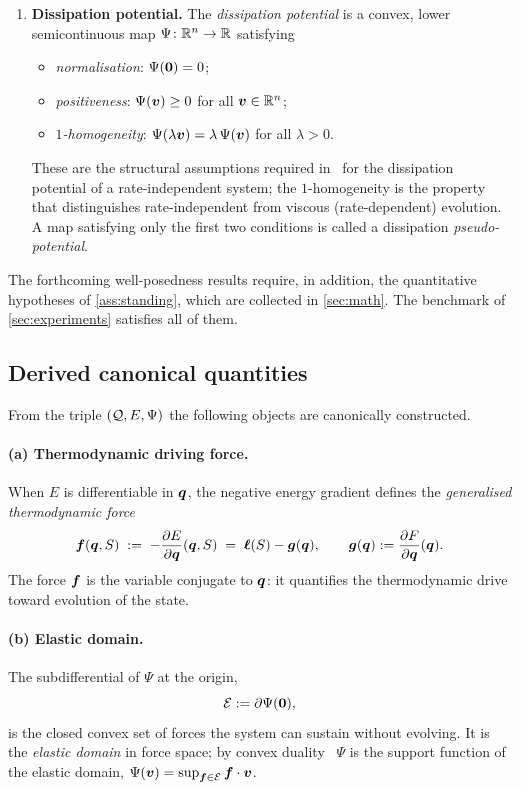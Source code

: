 \begin{enumerate}[label=(\roman*),leftmargin=2.2em,itemsep=3pt]
  \item \textbf{Dissipation potential.} The \emph{dissipation
  potential} is a convex, lower semicontinuous map
  $\Psi\colon\mathbb{R}^n\to\mathbb{R}$ satisfying
  \begin{itemize}[leftmargin=1.4em,itemsep=1pt]
    \item \emph{normalisation}: $\Psi(\bm{0})=0$;
    \item \emph{positiveness}: $\Psi(\bm{v})\ge 0$ for all $\bm{v}\in\mathbb{R}^n$;
    \item \emph{$1$-homogeneity}:
    $\Psi(\lambda\bm{v})=\lambda\,\Psi(\bm{v})$ for all $\lambda>0$.
  \end{itemize}
  These are the structural assumptions required
  in~\cite{Mielke2005,MielkeRoubicek} for the dissipation potential of
  a rate-independent system; the $1$-homogeneity is the property that
  distinguishes rate-independent from viscous (rate-dependent)
  evolution. A map satisfying only the first two conditions is called
  a dissipation \emph{pseudo-potential}.
\end{enumerate}

The forthcoming well-posedness results require, in addition, the
quantitative hypotheses of \cref{ass:standing}, which are collected in
\cref{sec:math}. The benchmark of \cref{sec:experiments} satisfies all
of them.

\subsection{Derived canonical quantities}\label{sec:derived}

From the triple $(\mathcal{Q},E,\Psi)$ the following objects are canonically
constructed.

\paragraph{(a) Thermodynamic driving force.}
When $E$ is differentiable in $\bm{q}$, the negative energy gradient
defines the \emph{generalised thermodynamic force}
\begin{equation}\label{eq:force}
  \bm{f}(\bm{q}, S) \;:=\; -\frac{\partial E}{\partial \bm{q}}(\bm{q}, S)
  \;=\; \bm{\ell}(S) - \bm{g}(\bm{q}),
  \qquad
  \bm{g}(\bm{q}) := \frac{\partial F}{\partial\bm{q}}(\bm{q}).
\end{equation}
The force $\bm{f}$ is the variable conjugate to $\bm{q}$: it quantifies
the thermodynamic drive toward evolution of the state.

\paragraph{(b) Elastic domain.}
The subdifferential of $\Psi$ at the origin,
\begin{equation}\label{eq:elastic_domain}
  \mathcal{E} := \partial\Psi(\bm{0}),
\end{equation}
is the closed convex set of forces the system can sustain without
evolving. It is the \emph{elastic domain} in force space; by convex
duality~\cite{rockafellar1970,ekeland1999convex} $\Psi$ is the support
function of the elastic domain, $\Psi(\bm{v})=\sup_{\bm{f}\in\mathcal{E}}\bm{f}\cdot\bm{v}$.

